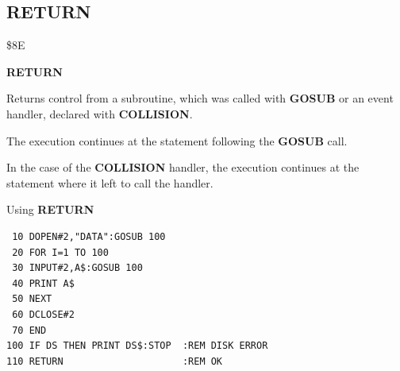 \subsection{RETURN}
\begin{description}[leftmargin=2cm,style=nextline]
\item [Token:] \$8E
\item [Format:] {\bf RETURN}
\item [Usage:]  Returns control from a subroutine, which
                was called with {\bf GOSUB} or an event
                handler, declared with {\bf COLLISION}.

                The execution continues at the statement
                following the {\bf GOSUB} call.

                In the case of the {\bf COLLISION} handler,
                the execution continues at the statement
                where it left to call the handler.

\item [Example:] Using {\bf RETURN}

\begin{tcolorbox}[colback=black,coltext=white]
\verbatimfont{\codefont}
\begin{verbatim}
 10 DOPEN#2,"DATA":GOSUB 100
 20 FOR I=1 TO 100
 30 INPUT#2,A$:GOSUB 100
 40 PRINT A$
 50 NEXT
 60 DCLOSE#2
 70 END
100 IF DS THEN PRINT DS$:STOP  :REM DISK ERROR
110 RETURN                     :REM OK
\end{verbatim}
\end{tcolorbox}
\end{description}


\newpage
